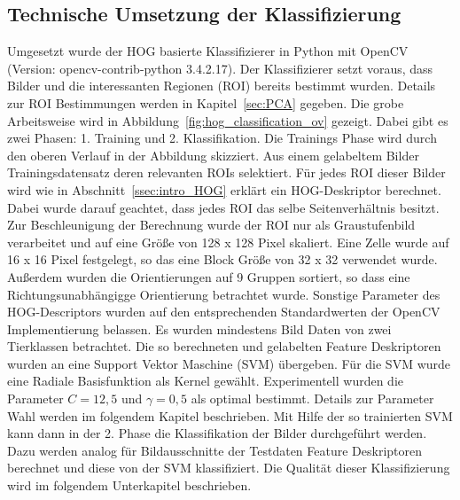 \subsection{Technische Umsetzung der Klassifizierung} \label{ssec:implementation}
Umgesetzt wurde der HOG basierte Klassifizierer in Python mit OpenCV (Version: opencv-contrib-python 3.4.2.17). Der Klassifizierer setzt voraus, dass Bilder und die interessanten Regionen (ROI) bereits bestimmt wurden. Details zur ROI Bestimmungen werden in Kapitel~\ref{sec:PCA} gegeben. Die grobe Arbeitsweise wird in Abbildung~\ref{fig:hog_classification_ov} gezeigt. Dabei gibt es zwei Phasen: 1. Training und 2. Klassifikation. Die Trainings Phase wird durch den oberen Verlauf in der Abbildung skizziert. Aus einem gelabeltem Bilder Trainingsdatensatz deren relevanten ROIs selektiert.  Für jedes ROI dieser Bilder wird wie in Abschnitt~\ref{ssec:intro_HOG} erklärt ein HOG-Deskriptor berechnet. Dabei wurde darauf geachtet, dass jedes ROI das selbe Seitenverhältnis besitzt. Zur Beschleunigung der Berechnung wurde der ROI nur als Graustufenbild verarbeitet und auf eine Größe von 128 x 128 Pixel skaliert. Eine Zelle wurde auf 16 x 16 Pixel festgelegt, so das eine Block Größe von 32 x 32 verwendet wurde. Außerdem wurden die Orientierungen auf 9 Gruppen sortiert, so dass eine Richtungsunabhängigge Orientierung betrachtet wurde. Sonstige Parameter des HOG-Descriptors wurden auf den entsprechenden Standardwerten der OpenCV Implementierung belassen. Es wurden mindestens Bild Daten von zwei Tierklassen betrachtet. Die so berechneten und gelabelten Feature Deskriptoren wurden an eine Support Vektor Maschine (SVM) übergeben. Für die SVM wurde eine Radiale Basisfunktion als Kernel gewählt. Experimentell wurden die Parameter $C = 12,5$ und $\gamma = 0,5$ als optimal bestimmt. Details zur Parameter Wahl werden im folgendem Kapitel beschrieben.
Mit Hilfe der so trainierten SVM kann dann in der 2. Phase die Klassifikation der Bilder durchgeführt werden. Dazu werden analog für Bildausschnitte der Testdaten Feature Deskriptoren berechnet und diese von der SVM klassifiziert. Die Qualität dieser Klassifizierung wird im folgendem Unterkapitel beschrieben.
